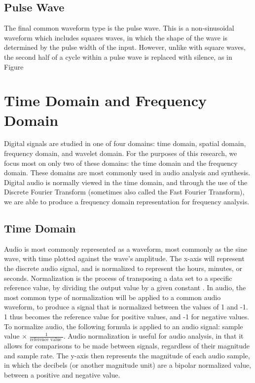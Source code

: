 \subsection{Pulse Wave}\label{subsection:pulse-wave}
The final common waveform type is the pulse wave. This is a non-sinusoidal waveform which includes squares waves, in which the shape of the wave is determined by the pulse width of the input. However, unlike with square waves, the second half of a cycle within a pulse wave is replaced with silence, as in Figure %

\section{Time Domain and Frequency Domain}

Digital signals are studied in one of four domains: time domain, spatial domain, frequency domain, and wavelet domain. For the purposes of this research, we focus most on only two of these domains: the time domain and the frequency domain. These domains are most commonly used in audio analysis and synthesis. Digital audio is normally viewed in the time domain, and through the use of the Discrete Fourier Transform (sometimes also called the Fast Fourier Transform), we are able to produce a frequency domain representation for frequency analysis.

\subsection{Time Domain}

Audio is most commonly represented as a waveform, most commonly as the sine wave, with time plotted against the wave's amplitude. The x-axis will represent the discrete audio signal, and is normalized to represent the hours, minutes, or seconds. Normalization is the process of transposing a data set to a specific reference value, by dividing the output value by a given constant \cite{Zjalic_2021}. In audio, the most common type of normalization will be applied to a common audio waveform, to produce a signal that is normalized between the values of 1 and -1. 1 thus becomes the reference value for positive values, and -1 for negative values. To normalize audio, the following formula is applied to an audio signal: sample value $\times$ $\frac{1}{\textrm{reference value }}$. Audio normalization is useful for audio analysis, in that it allows for comparisons to be made between signals, regardless of their magnitude and sample rate. The y-axis then represents the magnitude of each audio sample, in which the decibels (or another magnitude unit) are a bipolar normalized value, between a positive and negative value. 

